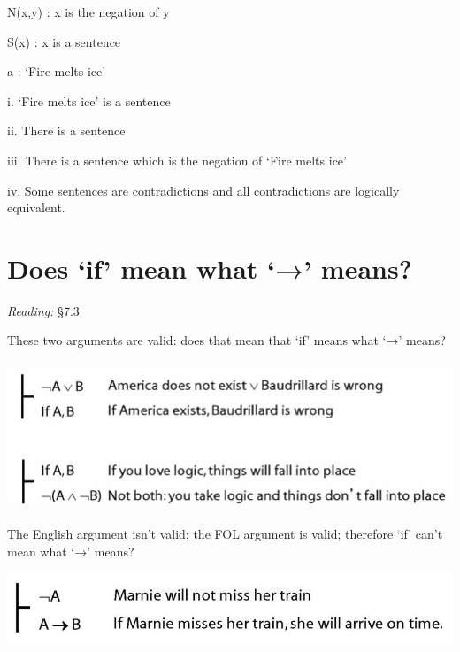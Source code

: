 \documentclass[12pt]{extarticle}
\begin{document}
\begin{multicols*}{3}
\hspace{5mm} N(x,y)	: x is the negation of y
 
\hspace{5mm} S(x)	: x is a sentence
 
\hspace{5mm} a	 : ‘Fire melts ice’
 
i.	‘Fire melts ice’ is a sentence
 
ii.	There is a sentence
 
iii.	There is a sentence which is the negation of ‘Fire melts ice’
 
iv.	Some sentences are contradictions and all contradictions are logically equivalent.
 
 
 
\section{Does ‘if’ mean what ‘→’ means?}
 
\emph{Reading:} §7.3
 
\begin{minipage}{\columnwidth}
 
These two arguments are valid: does that mean that `if' means what `→' means?
 
\begin{center}
\includegraphics[scale=0.3]{img/if_is_arrow.png}
\end{center}
\end{minipage}
 
\begin{minipage}{\columnwidth}
 
The English argument isn't valid; the FOL argument is valid; therefore `if' can't mean what `→' means?
 
\begin{center}
\includegraphics[scale=0.3]{img/if_aint_arrow.png}
\end{center}
\end{minipage}
 

\end{multicols*}
\end{document}
